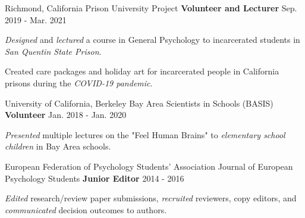 \begin{cventries}
    
  \cventry
    {Richmond, California} %
    {Prison University Project}
    {\textbf{Volunteer and Lecturer}} %
    {Sep. 2019 - Mar. 2021} %
    {
      \begin{cvitems} %
        \item {\textit{Designed} and \textit{lectured} a course in General Psychology to incarcerated students in \textit{San Quentin State Prison}.}
        \item {Created care packages and holiday art for incarcerated people in California prisons during the \textit{COVID-19 pandemic}.}
      \end{cvitems}
    }
    
  \cventry
  	{University of California, Berkeley} %
  	{Bay Area Scientists in Schools (BASIS)}
    {\textbf{Volunteer}} %
    {Jan. 2018 - Jan. 2020} %
    {
      \begin{cvitems} %
        \item {\textit{Presented} multiple lectures on the "Feel Human Brains" to \textit{elementary school children} in Bay Area schools.}
      \end{cvitems}
    }
    
  \cventry
    {European Federation of Psychology Students' Association}
    {Journal of European Psychology Students} %
    {\textbf{Junior Editor}} %
    {2014 - 2016} %
    {
      \begin{cvitems} %
        \item {\textit{Edited} research/review paper submissions, \textit{recruited} reviewers, copy editors, and \textit{communicated} decision outcomes to authors.}
      \end{cvitems}
    }
    
    
\end{cventries}
    
